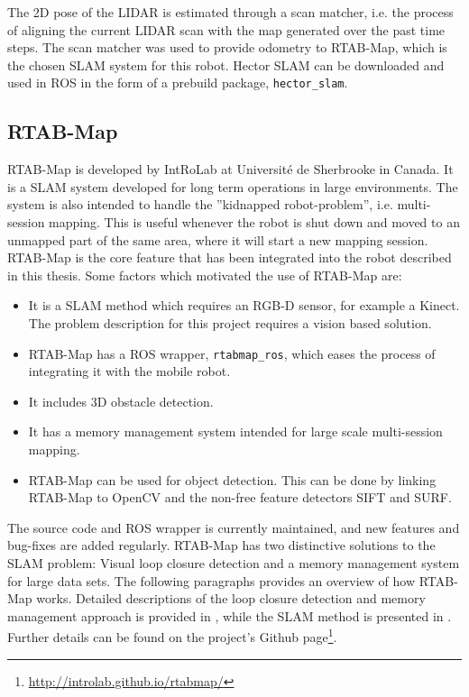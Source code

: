 The 2D pose of the \ac{LIDAR} is estimated through a scan matcher, i.e. the process of aligning the current \ac{LIDAR} scan with the map generated over the past time steps. The scan matcher was used to provide odometry to \ac{RTAB-Map}, which is the chosen \ac{SLAM} system for this robot. Hector SLAM can be downloaded and used in \ac{ROS} in the form of a prebuild package, \texttt{hector\_slam}.  

\subsection{RTAB-Map}
\label{sec:RTAB-Map}

\ac{RTAB-Map} is developed by IntRoLab at Université de Sherbrooke in Canada. It is a \ac{SLAM} system developed for long term operations in large environments. The system is also intended to handle the ''kidnapped robot-problem'', i.e. multi-session mapping. This is useful whenever the robot is shut down and moved to an unmapped part of the same area, where it will start a new mapping session. \ac{RTAB-Map} is the core feature that has been integrated into the robot described in this thesis. Some factors which motivated the use of \ac{RTAB-Map} are:

\begin{itemize}
	\item It is a \ac{SLAM} method which requires an RGB-D sensor, for example a Kinect. The problem description for this project requires a vision based solution.
	\item \ac{RTAB-Map} has a \ac{ROS} wrapper, \texttt{rtabmap\_ros}, which eases the process of integrating it with the mobile robot.
	\item It includes 3D obstacle detection.
	\item It has a memory management system intended for large scale multi-session mapping.
	\item \ac{RTAB-Map} can be used for object detection. This can be done by linking \ac{RTAB-Map} to OpenCV and the non-free feature detectors \ac{SIFT} and \ac{SURF}.
\end{itemize}

The source code and \ac{ROS} wrapper is currently maintained, and new features and bug-fixes are added regularly. \ac{RTAB-Map} has two distinctive solutions to the \ac{SLAM} problem: Visual loop closure detection and a memory management system for large data sets. The following paragraphs provides an overview of how \ac{RTAB-Map} works. Detailed descriptions of the loop closure detection and memory management approach is provided in  \cite{labbe13appearance}, while the \ac{SLAM} method is presented in \cite{labbe14online}. Further details can be found on the project's Github page\footnote{\url{http://introlab.github.io/rtabmap/}}.

